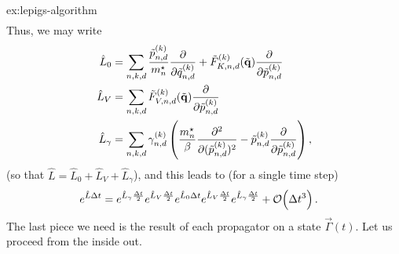 \begin{DefAnswer}{ex:lepigs-algorithm}
\begin{subequations}
\begin{align}
	\end{align}
	\end{subequations}
	Thus, we may write
	\begin{subequations}
	\begin{align}
		\hat{L}_0
		&= \sum_{n,k,d}
				\frac{\tilde{p}_{n,d}^{(k)}}{{m}^\star_n} \frac{\partial}{\partial \tilde{q}_{n,d}^{(k)}}
				+ \tilde{F}_{K,n,d}^{(k)}(\tilde{\bm{\mathbf{q}}}) \frac{\partial}{\partial \tilde{p}_{n,d}^{(k)}} \\
		\hat{L}_V
		&= \sum_{n,k,d}
				\tilde{F}_{V,n,d}^{(k)}(\tilde{\bm{\mathbf{q}}}) \frac{\partial}{\partial \tilde{p}_{n,d}^{(k)}} \\
		\hat{L}_\gamma
		&= \sum_{n,k,d} \gamma_{n,d}^{(k)} \left(
				\frac{{m}^\star_n}{\beta} \frac{\partial^2}{\partial (\tilde{p}_{n,d}^{(k)})^2}
				- \tilde{p}_{n,d}^{(k)} \frac{\partial}{\partial \tilde{p}_{n,d}^{(k)}}
			\right),
	\end{align}
	\end{subequations}
	(so that $\hat{L} = \hat{L}_0 + \hat{L}_V + \hat{L}_\gamma$), and this leads to (for a single time step)~\cite{tuckerman1992reversible,bussi2007accurate}
	\begin{align}
		e^{\hat{L} \Delta t}
		&= e^{\hat{L}_\gamma \frac{\Delta t}{2}}
				e^{\hat{L}_V \frac{\Delta t}{2}}
				e^{\hat{L}_0 \Delta t}
				e^{\hat{L}_V \frac{\Delta t}{2}}
				e^{\hat{L}_\gamma \frac{\Delta t}{2}}
			+ \mathcal{O}\!\left( \Delta t^3 \right).
	\end{align}
	The last piece we need is the result of each propagator on a state $\vec{\Gamma}(t)$.
	Let us proceed from the inside out.


\end{DefAnswer}
